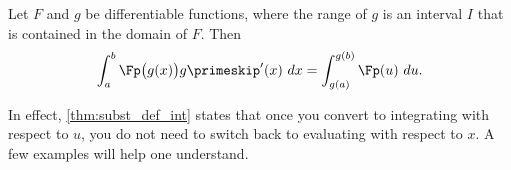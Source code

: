 \begin{theorem}\label{thm:subst_def_int}
Let $F$ and $g$ be differentiable functions, where the range of $g$ is an interval $I$ that is contained in the domain of $F$. Then 
\[\int_a^b \Fp\big(g(x)\big)g\primeskip'(x)\ dx = \int_{g(a)}^{g(b)} \Fp(u)\ du.\]
\end{theorem}

In effect, \autoref{thm:subst_def_int} states that once you convert to integrating with respect to $u$, you do not need to switch back to evaluating with respect to $x$. A few examples will help one understand.\\

